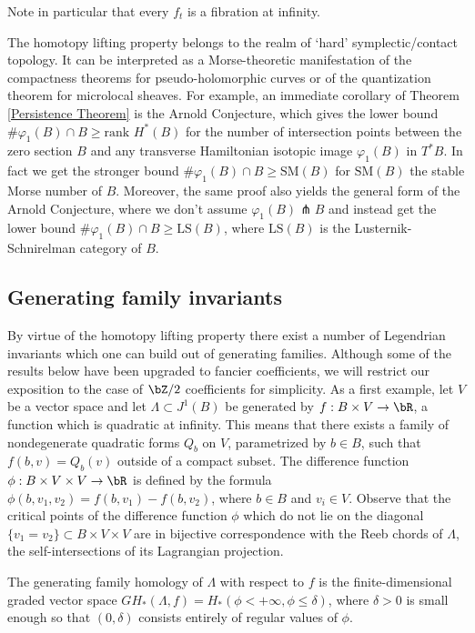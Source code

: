 \begin{remark} Note in particular that every $f_t$ is a fibration at infinity. \end{remark}

The homotopy lifting property belongs to the realm of `hard' symplectic/contact topology. It can be interpreted as a Morse-theoretic manifestation of the compactness theorems for pseudo-holomorphic curves or of the quantization theorem for microlocal sheaves. For example, an immediate corollary of Theorem \ref{Persistence Theorem} is the Arnold Conjecture, which gives the lower bound $\# \varphi_1(B) \cap B\geq \text{rank }H^*(B)$ for the number of intersection points between the zero section $B$ and any transverse Hamiltonian isotopic image $\varphi_1(B)$ in $T^*B$. In fact we get the stronger bound $\# \varphi_1(B) \cap B\geq \text{SM}(B)$ for $\text{SM}(B)$ the stable Morse number of $B$. Moreover, the same proof also yields the general form of the Arnold Conjecture, where we don't assume $\varphi_1(B) \pitchfork B$ and instead get the lower bound $\# \varphi_1(B) \cap B \geq \text{LS}(B)$, where $\text{LS}(B)$ is the Lusternik-Schnirelman category of $B$.

\subsection{Generating family invariants}

By virtue of the homotopy lifting property there exist a number of Legendrian invariants which one can build out of generating families. Although some of the results below have been upgraded to fancier coefficients, we will restrict our exposition to the case of $\bZ/2$ coefficients for simplicity. As a first example, let $V$ be a vector space and let $\Lambda \subset J^1(B)$ be generated by $f:B \times V \to \bR$, a function which is quadratic at infinity. This means that there exists a family of nondegenerate quadratic forms $Q_b$ on $V$, parametrized by $b \in B$, such that $f(b,v) = Q_b(v)$ outside of a compact subset. The difference function $\phi: B \times V \times V \to \bR$ is defined by the formula $\phi(b,v_1,v_2)=f(b,v_1)-f(b,v_2)$, where $ b \in B$ and $v_i \in V$. Observe that the critical points of the difference function $\phi$ which do not lie on the diagonal $\{ v_1 = v_2 \} \subset B \times V \times V$ are in bijective correspondence with the Reeb chords of $\Lambda$, \ie the self-intersections of its Lagrangian projection.

\begin{definition}
The generating family homology of $\Lambda$ with respect to $f$ is the finite-dimensional graded vector space $GH_*(\Lambda, f) = H_*(\phi<+\infty, \phi \leq \delta)$, where $\delta>0$ is small enough so that $(0, \delta)$ consists entirely of regular values of $\phi$.
\end{definition}

